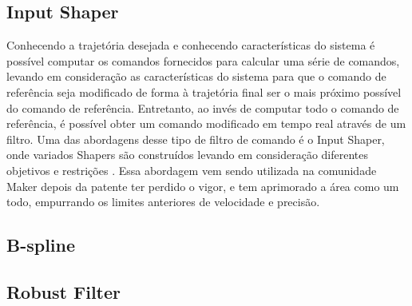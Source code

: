 \subsection{Input Shaper}
Conhecendo a trajetória desejada e conhecendo características 
do sistema é possível computar os comandos fornecidos para 
calcular uma série de comandos, levando em consideração as 
características do sistema para que o comando de referência 
seja modificado de forma à trajetória final ser o mais próximo 
possível do comando de referência. Entretanto, ao invés de 
computar todo o comando de referência, é possível obter um 
comando modificado em tempo real através de um filtro. 
Uma das abordagens desse tipo de filtro de comando é o 
Input Shaper, onde variados Shapers são construídos levando 
em consideração diferentes objetivos e restrições 
\cite{singhose97}.
Essa abordagem vem sendo utilizada na comunidade Maker depois 
da patente ter perdido o vigor, e tem aprimorado a área como
um todo, empurrando os limites anteriores de velocidade e 
precisão.

\subsection{B-spline}

\subsection{Robust Filter}
